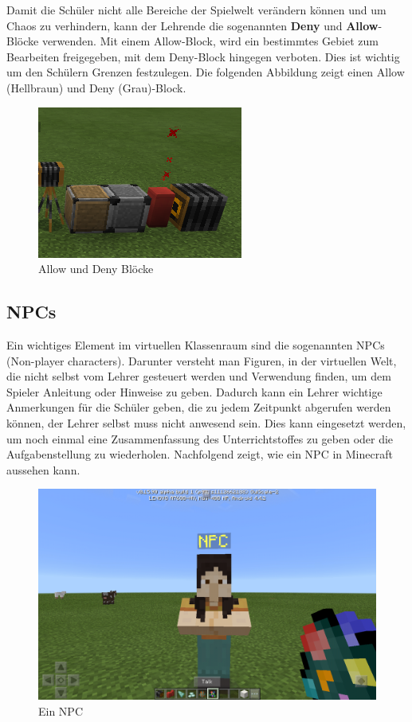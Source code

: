 Damit die Schüler nicht alle Bereiche der Spielwelt verändern können und um Chaos zu verhindern, kann der Lehrende die sogenannten \textbf{Deny} und \textbf{Allow}-Blöcke verwenden. Mit einem Allow-Block, wird ein bestimmtes Gebiet zum Bearbeiten freigegeben, mit dem Deny-Block hingegen verboten. Dies ist wichtig um den Schülern Grenzen festzulegen.
Die folgenden Abbildung zeigt einen Allow (Hellbraun) und Deny (Grau)-Block.

\begin{figure}[ht]
	\centering
	\includegraphics{images/AllowAndDenyBlocks.png}
	\caption{Allow und Deny Blöcke \cite{GamepediaMinecraft}}
	\label{allowDenyBlocks}
\end{figure}

\subsection{NPCs}

Ein wichtiges Element im virtuellen Klassenraum sind die sogenannten NPCs (Non-player characters).
Darunter versteht man Figuren, in der virtuellen Welt, die nicht selbst vom Lehrer gesteuert werden und Verwendung finden, um dem Spieler Anleitung oder Hinweise zu geben. Dadurch kann ein Lehrer wichtige Anmerkungen für die Schüler geben, die zu jedem Zeitpunkt abgerufen werden können, der Lehrer selbst muss nicht anwesend sein.
Dies kann eingesetzt werden, um noch einmal eine Zusammenfassung des Unterrichtstoffes zu geben oder die Aufgabenstellung zu wiederholen. Nachfolgend zeigt, wie ein NPC in Minecraft aussehen kann.

\begin{figure}[ht]
	\centering
	\includegraphics[width=\textwidth,height=\textheight,keepaspectratio]{images/NPC.png}
	\caption{Ein NPC \cite{GamepediaMinecraft}}
	\label{npc}
\end{figure}

